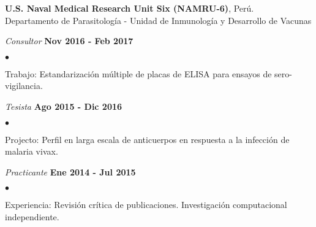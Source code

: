 \documentclass[margin,line]{res}
\newenvironment{list1}{
	\begin{list}{\ding{113}}{%
			\setlength{\itemsep}{0in}
			\setlength{\parsep}{0in} \setlength{\parskip}{0in}
			\setlength{\topsep}{0in} \setlength{\partopsep}{0in}
			\setlength{\leftmargin}{0.17in}}}{\end{list}}
\newenvironment{list2}{
	\begin{list}{$\bullet$}{%
			\setlength{\itemsep}{0in}
			\setlength{\parsep}{0in} \setlength{\parskip}{0in}
			\setlength{\topsep}{0in} \setlength{\partopsep}{0in}
			\setlength{\leftmargin}{0.2in}}}{\end{list}}
\begin{document}
\begin{resume}
		{\bf U.S. Naval Medical Research Unit Six (NAMRU-6)}, Perú.\\
		Departamento de Parasitología - Unidad de Inmunología y Desarrollo de Vacunas\\
		\vspace*{-.1in}
		\begin{list1}
			\item[] {\em Consultor} \hfill {\bf Nov 2016 - Feb 2017}\\
			\vspace*{-.1in}
			\begin{list2}
				\item Trabajo: Estandarización múltiple de placas de ELISA para ensayos de sero-vigilancia.\\
			\end{list2}
			\vspace*{-.1in}
			\item[] {\em Tesista} \hfill {\bf Ago 2015 - Dic 2016}\\
			\vspace*{-.1in}
			\begin{list2}
				\item Projecto: Perfil en larga escala de anticuerpos en respuesta a la infección de malaria vivax.\\
			\end{list2}
			\vspace*{-.1in}
			\item[] {\em Practicante} \hfill {\bf Ene 2014 - Jul 2015}\\
			\vspace*{-.1in}
			\begin{list2} %
				\item Experiencia: Revisión crítica de publicaciones. Investigación computacional independiente.
			\end{list2}
		\end{list1}
		

\end{resume}
\end{document}
